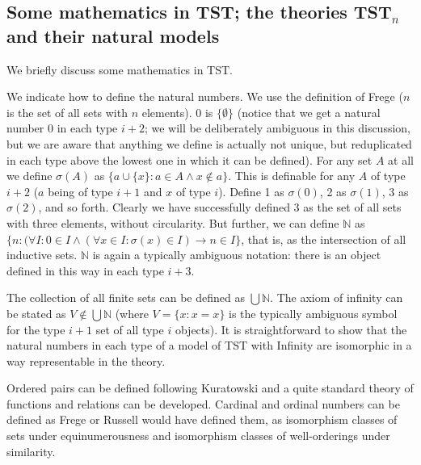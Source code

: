 \documentclass[12pt]{article}
\begin{document}
\newpage

\subsection{Some mathematics in TST;  the theories TST$_n$ and their natural models}

We briefly discuss some mathematics in TST.

We indicate how to define the natural numbers.  We use the definition of Frege ($n$ is the set of all sets with $n$ elements).  0 is $\{\emptyset\}$ (notice that we get a natural number 0 in each type $i+2$;  we will be deliberately ambiguous in this discussion, but we are aware that anything we define is actually not unique, but reduplicated in each type above the lowest one in which it can be defined).  For any set $A$ at all we define $\sigma(A)$ as $\{a \cup \{x\}:a \in A \wedge x \not\in a\}$.  This is definable for any $A$ of type $i+2$ ($a$ being of type $i+1$ and $x$ of type $i$).  Define 1 as $\sigma(0)$, 2 as $\sigma(1)$,  3 as $\sigma(2)$, and so forth.  Clearly we have successfully defined 3 as the set of all sets with three elements, without circularity.
But further, we can define $\mathbb N$ as $\{n:(\forall I:0 \in I \wedge (\forall x \in I:\sigma(x) \in I) \rightarrow n \in I\}$, that is, as the intersection of all inductive sets.
$\mathbb N$ is again a typically ambiguous notation:  there is an object defined in this way in each type $i+3$.

The collection of all finite sets can be defined as $\bigcup \mathbb N$.  The axiom of infinity can be stated as $V \not\in \bigcup \mathbb N$ (where $V= \{x:x=x\}$ is the typically ambiguous symbol for the type $i+1$ set of all type $i$ objects).  It is straightforward to show that the natural numbers in each type of a model of TST with Infinity are isomorphic in a way representable in the theory.

Ordered pairs can be defined following Kuratowski and a quite standard theory of functions and relations can be developed.  Cardinal and ordinal numbers can be defined as Frege or Russell would have defined them, as isomorphism classes of sets under equinumerousness and isomorphism classes of well-orderings under similarity.  
\end{document}
